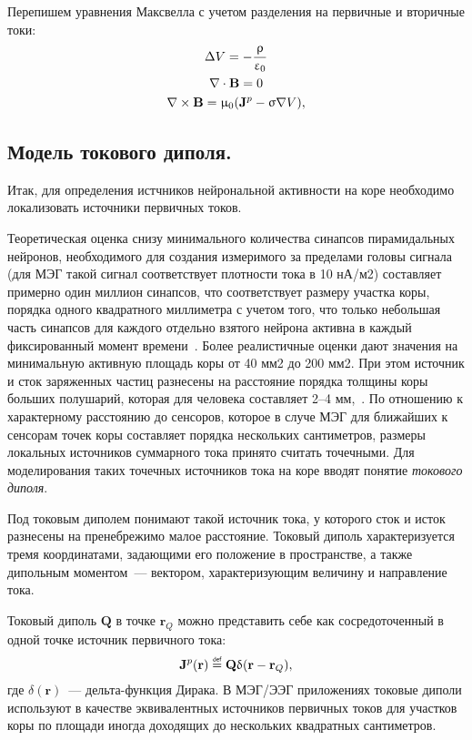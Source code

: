 Перепишем уравнения Максвелла с учетом разделения на первичные и вторичные токи:
\begin{gather}
    \Delta V = -\frac{\uprho}{\upvarepsilon_0} \label{eq:max_quasi_prim_sec1} \\
    \nabla \cdot \mathbf{B} = 0 \label{eq:max_quasi_prim_sec2} \\
    \nabla \times \mathbf{B} = \upmu_0 (\mathbf{J}^p - \upsigma \nabla V) \label{eq:max_quasi_prim_sec3},
\end{gather}

\subsection{Модель токового диполя.}

Итак, для определения истчников нейрональной активности на коре необходимо
локализовать источники первичных токов.

Теоретическая оценка снизу минимального количества синапсов пирамидальных
нейронов, необходимого для создания измеримого за пределами головы сигнала (для
МЭГ такой сигнал соответствует плотности тока в 10 нА/м2) составляет примерно
один миллион синапсов, что соответствует размеру участка коры, порядка одного
квадратного миллиметра с учетом того, что только небольшая часть синапсов для
каждого отдельно взятого нейрона активна в каждый фиксированный момент
времени~\cite{Hamalainen1993}.  Более реалистичные оценки дают значения на
минимальную активную площадь коры от 40 мм2 до 200 мм2.  При этом источник и
сток заряженных частиц разнесены на расстояние порядка толщины коры больших
полушарий, которая для человека составляет 2--4 мм,~\cite{saladin2011human}.
По отношению к характерному расстоянию до сенсоров, которое в случе МЭГ
для ближайших к сенсорам точек коры составляет порядка нескольких сантиметров,
размеры локальных источников суммарного тока принято считать точечными.
Для моделирования таких точечных источников тока на
коре вводят понятие \emph{токового диполя}.

Под токовым диполем понимают такой источник тока, у которого сток и исток
разнесены на пренебрежимо малое расстояние.  Токовый диполь характеризуется
тремя координатами, задающими его положение в пространстве, а также дипольным
моментом~--- вектором, характеризующим величину и направление тока.

Токовый диполь $\mathbf{Q}$ в точке $\mathbf{r}_Q$ можно представить себе как сосредоточенный
в одной точке источник первичного тока:
\begin{equation}
    \mathbf{J}^p(\mathbf{r}) \defeq \mathbf{Q}\delta(\mathbf{r} - \mathbf{r}_Q),
    \label{eq:cur_dip_def}
\end{equation}
где $\delta(\mathbf{r})$~--- дельта-функция Дирака.
В МЭГ/ЭЭГ приложениях токовые диполи используют в качестве эквивалентных источников первичных токов для
участков коры по площади иногда доходящих до нескольких квадратных сантиметров.

